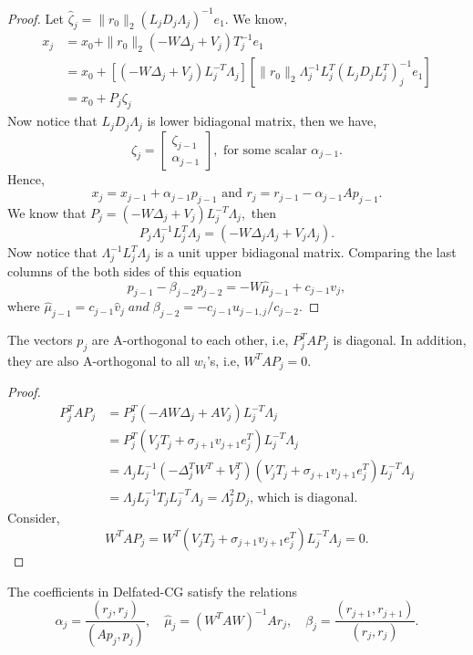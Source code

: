 \documentclass[10pt,a4paper]{article}
\begin{document}
\begin{proof}
Let $\hat{\zeta}_j=\|r_0\|_2(L_jD_j\Lambda_j)^{-1}e_1$. We know,
\begin{align*}
x_j&=x_0+\|r_0\|_2(-W\Delta_j+V_j)T^{-1}_je_1\\
&=x_0+[(-W\Delta_j+V_j)L^{-T}_j\Lambda_j][\|r_0\|_2\Lambda^{-1}_jL^{T}_j(L_jD_jL^T_j)^{-1}_je_1] \\
&= x_0+P_j\zeta_j
\end{align*}
Now notice that $L_jD_j\Lambda_j$ is lower bidiagonal matrix, then we have,
$$\zeta_j=\left[ \begin{array}{c} \zeta_{j-1} \\ \alpha_{j-1} \end{array} \right],\text{ for some scalar }\alpha_{j-1}.$$
Hence, $$x_j = x_{j-1}+\alpha_{j-1}p_{j-1}\text{ and }r_j = r_{j-1}-\alpha_{j-1}Ap_{j-1}.$$
We know that $P_j=(-W\Delta_j+V_j)L^{-T}_j\Lambda_j,$ then 
$$P_j\Lambda^{-1}_jL^{T}_j\Lambda_j=(-W\Delta_j\Lambda_j+V_j\Lambda_j).$$
Now notice that $\Lambda^{-1}_jL^{T}_j\Lambda_j$ is a unit upper bidiagonal matrix. Comparing the last columns of the both sides of this equation 
$$p_{j-1}-\beta_{j-2}p_{j-2}=-W\hat{\mu}_{j-1}+c_{j-1}v_j,$$
where $\hat{\mu}_{j-1}=c_{j-1}\hat{v}_j\;and\;\beta_{j-2}=-c_{j-1}u_{j-1,j}/c_{j-2}.$
\end{proof}

\begin{prop}
The vectors $p_j$ are A-orthogonal to each other, i.e, $P^T_jAP_j$ is diagonal. In addition, they are also A-orthogonal to all $w_i$'s, i.e, $W^TAP_j=0.$
\end{prop}

\begin{proof}
\begin{align*}
P^T_jAP_j&= P^T_j(-AW\Delta_j+AV_j)L^{-T}_j\Lambda_j \\
&= P^T_j(V_jT_j+\sigma_{j+1}v_{j+1}e^T_j)L^{-T}_j\Lambda_j \\
&= \Lambda_jL^{-1}_j(-\Delta^T_jW^T+V^T_j)(V_jT_j+\sigma_{j+1}v_{j+1}e^T_j)L^{-T}_j\Lambda_j \\
&= \Lambda_jL^{-1}_jT_jL^{-T}_j\Lambda_j = \Lambda^2_jD_j\text{, which is diagonal.}
\end{align*}
Consider, 
$$W^TAP_j=W^T(V_jT_j+\sigma_{j+1}v_{j+1}e^T_j)L^{-T}_j\Lambda_j=0.$$
\end{proof}

\begin{prop}
The coefficients in Delfated-CG satisfy the relations
$$\alpha_j=\dfrac{(r_j,r_j)}{(Ap_j,p_j)},\quad \hat{\mu}_j=(W^TAW)^{-1}Ar_j,\quad \beta_j=\dfrac{(r_{j+1},r_{j+1})}{(r_j,r_j)}.$$
\end{prop}
\end{document}
